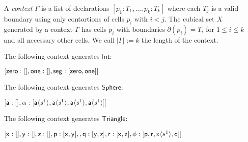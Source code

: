 \documentclass{llncs}
\makeatletter
\newcommand{\continuation}{??}
\newenvironment{examplecontd}[1]
{
  \renewcommand{\continuation}{\ref{#1}}\expcont[continued]
}
{\endexpcont}
\newcommand{\todo}[1]{
  \begin{tcolorbox}
    TODO {#1} 
  \end{tcolorbox}
}
\newcommand{\mdef}{:=}
\newcommand{\mname}[1]{\textit{{#1}}}
\newcommand{\mlist}[1]{[ {#1} ]}
\newcommand{\ctxtdim}[1]{|{#1}|}
\newcommand{\smap}[1]{s^{{#1}}}
\newcommand{\cont}[2]{\ensuremath{ \ifthenelse{\equal{#2}{}}{#1}{{#1}\langle{#2}\rangle}} }
\newcommand{\cset}[1]{\ensuremath{\mathsf{{#1}}}}
\newcommand{\boundary}[1]{\partial({#1})}
\newcommand{\substtwo}[2]{\tiny
  \arraycolsep=.4pt\def\arraystretch{1}
  \begin{array}{ll}
    0 &\mapsto {#1} \\
    1 &\mapsto {#2}
  \end{array}
}
\newcommand{\oneconst}{\smap{1}}
\newcommand{\oneid}{\substtwo{0}{1}}
\makeatother
\begin{document}


\begin{definition}
  A \mname{context} $\Gamma$ is a list of declarations $\mlist{ p_1 : T_1 ,
    \ldots , p_k : T_k}$ where each $T_j$ is a valid boundary using only
  contortions of cells $p_i$ with $i < j$. The cubical set $X$ generated by a context $\Gamma$
  has cells $p_i$ with boundaries $\boundary{p_i} = T_i$ for $1 \leq i \leq k$
  and all necessary other cells. We call $\ctxtdim{\Gamma} \mdef k$ the length
  of the context.
\end{definition}


\begin{examplecontd}{exp:int}
  The following context generates $\cset{Int}$:
  
  $\mlist{ \cset{zero} : \mlist{} , \cset{one} : \mlist{} , \cset{seg} : \mlist{
      \cont{\cset{zero}}{}, \cont{\cset{one}}{} }}$
\end{examplecontd}

\begin{examplecontd}{exp:sndsphere}
  The following context generates $\cset{Sphere}$:

  $\mlist{ \cset{a} : \mlist{} , \cset{\alpha} : \mlist{ \cont{\cset{a}}{\oneconst} , \cont{\cset{a}}{\oneconst} ,
  \cont{\cset{a}}{\oneconst}, \cont{\cset{a}}{\oneconst} }}$
  
\end{examplecontd}

\begin{examplecontd}{exp:triangle}
  The following context generates $\cset{Triangle}$:
  

  $\mlist{ \cset{x} : \mlist{} , \cset{y} : \mlist{} , \cset{z} : \mlist{} ,
    \cset{p} : \mlist{ \cset{x}, \cset{y}  } ,
    , \cset{q} : \mlist{ \cset{y}, \cset{z} }
    , \cset{r} : \mlist{ \cset{x}, \cset{z} }
    , \cset{\phi} : \mlist{ \cset{p} , \cset{r} ,
      \cont{\cset{x}}{\oneconst}, \cset{q} }
  }$

\end{examplecontd}
\end{document}
